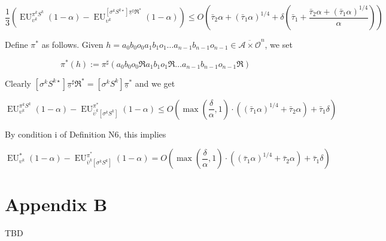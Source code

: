 \documentclass[a4paper]{article}
\newcommand{\Comment}[1]{}
\newcommand{\AP}[1]{\left(#1\right)}
\newcommand{\AB}[1]{\left[#1\right]}
\newcommand{\Ob}{\mathcal{O}}
\newcommand{\A}{\mathcal{A}}
\newcommand{\EU}{\operatorname{EU}}
\begin{document}
$$\frac{1}{3}\AP{\EU_{\upsilon^k}^{\pi^k S^{k}}(1-\alpha)-\EU_{\upsilon^k}^{\AB{\sigma^k S^{k\star}}\underline{\pi}^\sharp\Re^*}(1-\alpha)} \leq O\AP{\bar{\tau}_2 \alpha + (\bar{\tau}_1 \alpha)^{1/4} + \delta\AP{\bar{\tau}_1+\frac{\bar{\tau}_2 \alpha + (\bar{\tau}_1 \alpha)^{1/4}}{\alpha}}}$$

\Comment{Given $h = a_0 b_0 o_0 a_1 b_1 o_1 \ldots a_{n-1} b_{n-1} o_{n-1} \in \overline{\A \times \Ob}^n$, we use the notation 

$$\bar{\Re}^*h := a_0 b_0 o_0 \Re a_1 b_1 o_1 \Re \ldots a_{n-1} b_{n-1} o_{n-1} \Re \in \overline{\A \times \Ob'}^n$$

We define $\pi^*$ as by $\pi^*(h) := \pi^\star\AP{\bar{\Re}^*h}$.}

Define $\pi^*$ as follows. Given $h = a_0 b_0 o_0 a_1 b_1 o_1 \ldots a_{n-1} b_{n-1} o_{n-1} \in \overline{\A \times \Ob}^n$, we set

$$\pi^*(h) := \pi^\sharp\AP{a_0 b_0 o_0 \Re a_1 b_1 o_1 \Re \ldots a_{n-1} b_{n-1} o_{n-1} \Re}$$

Clearly $\AB{\sigma^k S^{k\star}}\underline{\pi}^\sharp\Re^* = \AB{\sigma^k S^{k}}\underline{\pi}^*$ and we get

$$\EU_{\upsilon^k}^{\pi^k S^{k}}(1-\alpha)-\EU_{\bar{\upsilon}^k\AB{\sigma^k S^{k}}}^{\pi^*}(1-\alpha) \leq O\AP{\max\AP{\frac{\delta}{\alpha},1}\cdot\AP{(\bar{\tau}_1 \alpha)^{1/4} + \bar{\tau}_2 \alpha}+\bar{\tau}_1\delta}$$

By condition i of Definition N6, this implies

$$\EU_{\upsilon^k}^{*}(1-\alpha)-\EU_{\bar{\upsilon}^k\AB{\sigma^k S^{k}}}^{\pi^*}(1-\alpha) = O\AP{\max\AP{\frac{\delta}{\alpha},1}\cdot\AP{(\bar{\tau}_1 \alpha)^{1/4} + \bar{\tau}_2 \alpha}+\bar{\tau}_1\delta}$$

\section{Appendix B}

TBD
\end{document}
